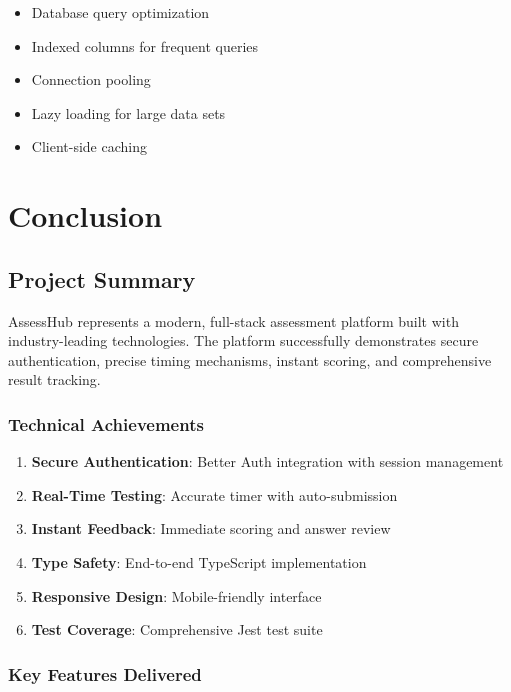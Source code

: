 \documentclass[12pt,a4paper]{report}
\begin{document}
\begin{itemize}
    \item Database query optimization
    \item Indexed columns for frequent queries
    \item Connection pooling
    \item Lazy loading for large data sets
    \item Client-side caching
\end{itemize}

\chapter{Conclusion}

\section{Project Summary}

AssessHub represents a modern, full-stack assessment platform built with industry-leading technologies. The platform successfully demonstrates secure authentication, precise timing mechanisms, instant scoring, and comprehensive result tracking.

\subsection{Technical Achievements}

\begin{enumerate}
    \item \textbf{Secure Authentication}: Better Auth integration with session management
    \item \textbf{Real-Time Testing}: Accurate timer with auto-submission
    \item \textbf{Instant Feedback}: Immediate scoring and answer review
    \item \textbf{Type Safety}: End-to-end TypeScript implementation
    \item \textbf{Responsive Design}: Mobile-friendly interface
    \item \textbf{Test Coverage}: Comprehensive Jest test suite
\end{enumerate}

\subsection{Key Features Delivered}
\end{document}
